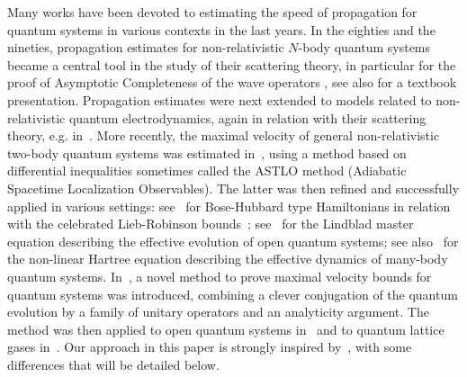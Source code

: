 \documentclass[12pt]{article}
\theoremstyle{plain}
\begin{document}
Many works have been devoted to estimating the speed of propagation for quantum systems in various contexts in the last years. In the eighties and the nineties, propagation estimates for non-relativistic $N$-body quantum systems became a central tool in the study of their scattering theory, in particular for the proof of Asymptotic Completeness of the wave operators \cite{Enss83,SigalSoffer88,SigalSoffer90,Graf90,Gerard92,Skibsted91,Derezinski93,HunzikerSigalSoffer99}, see also \cite{derezinski_ger} for a textbook presentation. Propagation estimates were next extended to models related to non-relativistic quantum electrodynamics, again in relation with their scattering theory, e.g. in~\cite{DerezinskiGerard99,FrohlichGriesemerSchlein02,BonyFaupinSigal12,FaupinSigal14}. More recently, the maximal velocity of general non-relativistic two-body quantum systems was estimated in~\cite{ArbunichPusateriSigalSoffer21}, using a method based on differential inequalities sometimes  called the ASTLO method (Adiabatic Spacetime Localization Observables). The latter was then refined and successfully applied in various settings: see~\cite{FaupinLemmSigal22_LR,FaupinLemmSigal22_maxv,LemmRubilianiZhang23,LemmRubilianiZhang25,KuwaharaLemmRubiliani25} for Bose-Hubbard type Hamiltonians in relation with the celebrated Lieb-Robinson bounds~\cite{LiebRobinson}; see~\cite{BreteauxFaupinLemmSigal22,BreteauxFaupinLemmSigalYangZhang24} for the Lindblad master equation describing the effective evolution of open quantum systems; see also~\cite{ArbunichFaupinPusateriSigal23} for the non-linear Hartree equation describing the effective dynamics of many-body quantum systems. In~\cite{SigalWU}, a novel method to prove maximal velocity bounds for quantum systems was introduced, combining a clever conjugation of the quantum evolution by a family of unitary operators and an analyticity argument. The method was then applied to open quantum systems in~\cite{SigalWu25} and to quantum lattice gases in~\cite{FaupinLemmSigalZhang25}. Our approach in this paper is strongly inspired by~\cite{SigalWU}, with some differences  that will be detailed below.
\end{document}
